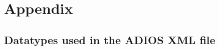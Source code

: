 \vspace{36pt}
\section{Appendix}

\vspace{37pt}
\subsection{Datatypes used in the ADIOS XML file}

\vspace{10pt}
